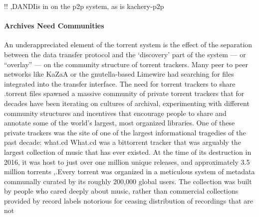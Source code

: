 \documentclass[nohyper]{tufte-book-jls}
\begin{document}
!! \cite{langilleBioTorrentsFileSharing2010},DANDIis in on the
p2p system, as is kachery-p2p

\hypertarget{archives-need-communities}{%
\paragraph{Archives Need Communities}\label{archives-need-communities}}

An underappreciated element of the torrent system is the effect of the
separation between the data transfer protocol and the `discovery' part
of the system --- or ``overlay'' --- on the community structure of
torrent trackers. Many peer to peer networks like KaZaA or the
gnutella-based Limewire had searching for files integrated into the
transfer interface. The need for torrent trackers to share .torrent
files spawned a massive community of private torrent trackers that for
decades have been iterating on cultures of archival, experimenting with
different community structures and incentives that encourage people to
share and annotate some of the world's largest, most organized
libraries. One of these private trackers was the site of one of the
largest informational tragedies of the past decade: what.cd
What.cd was a bittorrent tracker that was arguably the largest
collection of music that has ever existed. At the time of its
destruction in 2016, it was host to just over one million unique
releases, and approximately 3.5 million torrents
\cite{dunhamWhatCDLegacy2018},.Every torrent was organized in a
meticulous system of metadata communally curated by its roughly 200,000
global users. The collection was built by people who cared deeply about
music, rather than commercial collections provided by record labels
notorious for ceasing distribution of recordings that are not
\end{document}

